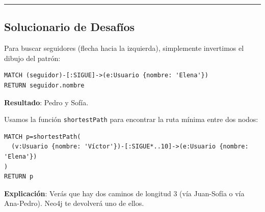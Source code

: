 \documentclass[12pt,a4paper]{article}
\begin{document}
\begin{center}\rule{0.5\linewidth}{0.5pt}\end{center}

\subsection{Solucionario de Desafíos}\label{solucionario-neo4j}

\begin{tcolorbox}[title=Solución Desafío 1: Invertir flechas]
Para buscar seguidores (flecha hacia la izquierda), simplemente invertimos el dibujo del patrón:
\begin{lstlisting}
MATCH (seguidor)-[:SIGUE]->(e:Usuario {nombre: 'Elena'})
RETURN seguidor.nombre
\end{lstlisting}
\textbf{Resultado}: Pedro y Sofía.
\end{tcolorbox}

\begin{tcolorbox}[title=Solución Desafío 2: Caminos Cortos]
Usamos la función \texttt{shortestPath} para encontrar la ruta mínima entre dos nodos:
\begin{lstlisting}
MATCH p=shortestPath(
  (v:Usuario {nombre: 'Víctor'})-[:SIGUE*..10]->(e:Usuario {nombre: 'Elena'})
)
RETURN p
\end{lstlisting}
\textbf{Explicación}: Verás que hay dos caminos de longitud 3 (vía Juan-Sofía o vía Ana-Pedro). Neo4j te devolverá uno de ellos.
\end{tcolorbox}
\end{document}
